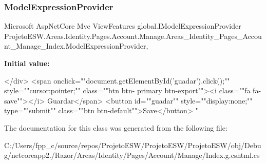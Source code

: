 \subsubsection{\texorpdfstring{Model\+Expression\+Provider}{ModelExpressionProvider}}
{\footnotesize\ttfamily Microsoft Asp\+Net\+Core Mvc View\+Features global.\+I\+Model\+Expression\+Provider Projeto\+E\+S\+W.\+Areas.\+Identity.\+Pages.\+Account.\+Manage.\+Areas\+\_\+\+Identity\+\_\+\+Pages\+\_\+\+Account\+\_\+\+Manage\+\_\+\+Index.\+Model\+Expression\+Provider\hspace{0.3cm}{\ttfamily [get]}, {}}

{\bfseries Initial value\+:}
\begin{DoxyCode}

    </div>
    <span onclick=\textcolor{stringliteral}{""}document.getElementById(\textcolor{stringliteral}{'guadar'}).click();\textcolor{stringliteral}{""} style=\textcolor{stringliteral}{""}cursor:pointer;\textcolor{stringliteral}{""} \textcolor{keyword}{class}=\textcolor{stringliteral}{""}btn btn-
      primary btn-export\textcolor{stringliteral}{""}><i \textcolor{keyword}{class}=\textcolor{stringliteral}{""}fa fa-save\textcolor{stringliteral}{""}></i> Guardar</span>
    <button \textcolor{keywordtype}{id}=\textcolor{stringliteral}{""}guadar\textcolor{stringliteral}{""} style=\textcolor{stringliteral}{""}display:none;\textcolor{stringliteral}{""} type=\textcolor{stringliteral}{""}submit\textcolor{stringliteral}{""} \textcolor{keyword}{class}=\textcolor{stringliteral}{""}btn btn-\textcolor{keywordflow}{default}\textcolor{stringliteral}{""}>Save</button>
\textcolor{stringliteral}{"}
\end{DoxyCode}


The documentation for this class was generated from the following file\+:\begin{DoxyCompactItemize}
\item 
C\+:/\+Users/fpp\+\_\+c/source/repos/\+Projeto\+E\+S\+W/\+Projeto\+E\+S\+W/\+Projeto\+E\+S\+W/obj/\+Debug/netcoreapp2./\+Razor/\+Areas/\+Identity/\+Pages/\+Account/\+Manage/Index.\+g.\+cshtml.\+cs\end{DoxyCompactItemize}

